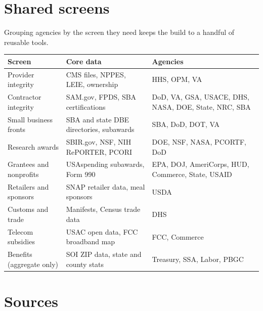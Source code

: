 \documentclass[letterpaper,11pt]{article}
\begin{document}
\hypertarget{shared-screens}{%
\section{Shared screens}\label{shared-screens}}

Grouping agencies by the screen they need keeps the build to a handful
of reusable tools.

\begingroup\small\setlength{\tabcolsep}{4pt}\renewcommand{\arraystretch}{1.25}
\begin{longtable}[l]{@{}>{\raggedright\arraybackslash}p{}>{\raggedright\arraybackslash}p{}>{\raggedright\arraybackslash}p{}@{}}
\rowcolor{coolblack}\leavevmode\color{white}\bfseries Screen & \leavevmode\color{white}\bfseries Core data & \leavevmode\color{white}\bfseries Agencies \\
\endhead
Provider integrity & CMS files, NPPES, LEIE, ownership & HHS, OPM, VA \\
Contractor integrity & SAM.gov, FPDS, SBA certifications & DoD, VA, GSA, USACE, DHS, NASA, DOE, State, NRC, SBA \\
Small business fronts & SBA and state DBE directories, subawards & SBA, DoD, DOT, VA \\
Research awards & SBIR.gov, NSF, NIH RePORTER, PCORI & DOE, NSF, NASA, PCORTF, DoD \\
Grantees and nonprofits & USAspending subawards, Form 990 & EPA, DOJ, AmeriCorps, HUD, Commerce, State, USAID \\
Retailers and sponsors & SNAP retailer data, meal sponsors & USDA \\
Customs and trade & Manifests, Census trade data & DHS \\
Telecom subsidies & USAC open data, FCC broadband map & FCC, Commerce \\
Benefits (aggregate only) & SOI ZIP data, state and county stats & Treasury, SSA, Labor, PBGC \\
\end{longtable}\endgroup

\hypertarget{sources}{%
\section{Sources}\label{sources}}
\end{document}
